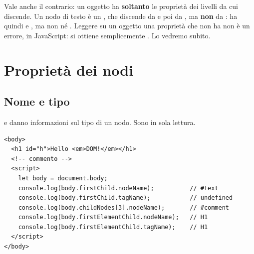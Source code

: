 Vale anche il contrario: un oggetto ha \textbf{soltanto} le proprietà dei
livelli da cui discende. Un nodo di testo è un , che discende da
 e poi da , ma \textbf{non} da :
ha quindi  e , ma non  né
. Leggere su un oggetto una proprietà che non ha non è un
errore, in JavaScript: si ottiene semplicemente . Lo vedremo
subito.

\section{Proprietà dei nodi}

\subsection{Nome e tipo}

 e  danno informazioni sul tipo di un nodo. Sono in
sola lettura.

\begin{affianco}[0.6][c]
\begin{lstlisting}[style=html, name=nodename.html]
<body>
  <h1 id="h">Hello <em>DOM!</em></h1>
  <!-- commento -->
  <script>
    let body = document.body;
    console.log(body.firstChild.nodeName);          // #text
    console.log(body.firstChild.tagName);           // undefined
    console.log(body.childNodes[3].nodeName);       // #comment
    console.log(body.firstElementChild.nodeName);   // H1
    console.log(body.firstElementChild.tagName);    // H1
  </script>
</body>
\end{lstlisting}
\risultato
\begin{immagine}
\end{immagine}
\end{affianco}

